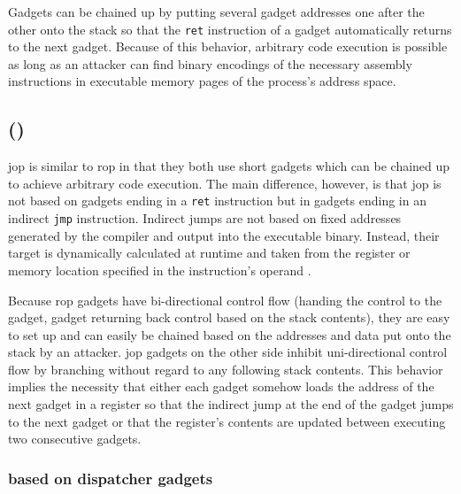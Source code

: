 Gadgets can be chained up by putting several gadget addresses one after the other onto the stack so that the \texttt{ret} instruction of a gadget automatically returns to the next gadget.
Because of this behavior, arbitrary code execution is possible as long as an attacker can find binary encodings of the necessary assembly instructions in executable memory pages of the process's address space.

\subsection{ ()}
\label{subsec:cr-jop}

\gls{jop} is similar to \gls{rop} in that they both use short gadgets which can be chained up to achieve arbitrary code execution.
The main difference, however, is that \gls{jop} is not based on gadgets ending in a \texttt{ret} instruction but in gadgets ending in an indirect \texttt{jmp} instruction.
Indirect jumps are not based on fixed addresses generated by the compiler and output into the executable binary.
Instead, their target is dynamically calculated at runtime and taken from the register or memory location specified in the instruction's operand \cite[3-517\psqq]{IntelCorporation2020}.

Because \gls{rop} gadgets have bi-directional control flow (handing the control to the gadget, gadget returning back control based on the stack contents), they are easy to set up and can easily be chained based on the addresses and data put onto the stack by an attacker.
\gls{jop} gadgets on the other side inhibit uni-directional control flow by branching without regard to any following stack contents.
This behavior implies the necessity that either each gadget somehow loads the address of the next gadget in a register so that the indirect jump at the end of the gadget jumps to the next gadget or that the register's contents are updated between executing two consecutive gadgets.


\subsubsection{ based on dispatcher gadgets}
\label{subsubsec:cr-jop-dispatcher}

